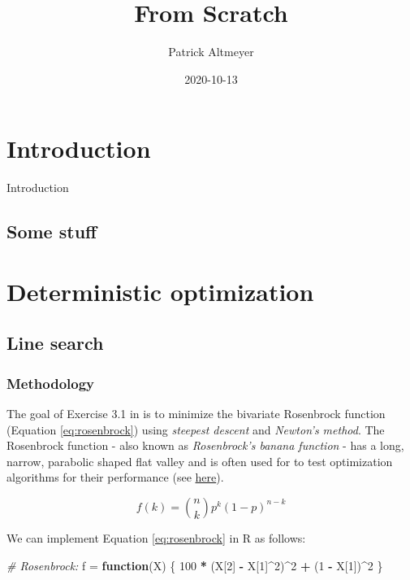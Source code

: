 \documentclass[
]{book}
\title{From Scratch}
\author{Patrick Altmeyer}
\date{2020-10-13}
\newenvironment{Shaded}{\begin{snugshade}}{\end{snugshade}}
\newcommand{\CommentTok}[1]{\textcolor[rgb]{0.56,0.35,0.01}{\textit{#1}}}
\newcommand{\ControlFlowTok}[1]{\textcolor[rgb]{0.13,0.29,0.53}{\textbf{#1}}}
\newcommand{\DecValTok}[1]{\textcolor[rgb]{0.00,0.00,0.81}{#1}}
\newcommand{\NormalTok}[1]{#1}
\newcommand{\OperatorTok}[1]{\textcolor[rgb]{0.81,0.36,0.00}{\textbf{#1}}}
\newcommand{\StringTok}[1]{\textcolor[rgb]{0.31,0.60,0.02}{#1}}
\begin{document}
\maketitle

{
\setcounter{tocdepth}{1}
\tableofcontents
}
\hypertarget{intro}{%
\chapter{Introduction}\label{intro}}

Introduction

\hypertarget{some-stuff}{%
\section{Some stuff}\label{some-stuff}}

\hypertarget{det-opt}{%
\chapter{Deterministic optimization}\label{det-opt}}

\hypertarget{line-search}{%
\section{Line search}\label{line-search}}

\hypertarget{methodology}{%
\subsection{Methodology}\label{methodology}}

The goal of Exercise 3.1 in \citet{nw2006numerical} is to minimize the bivariate Rosenbrock function (Equation \eqref{eq:rosenbrock}) using \emph{steepest descent} and \emph{Newton's method}. The Rosenbrock function - also known as \emph{Rosenbrock's banana function} - has a long, narrow, parabolic shaped flat valley and is often used for to test optimization algorithms for their performance (see \href{https://en.wikipedia.org/wiki/Rosenbrock_function}{here}).

\begin{equation} 
  f\left(k\right) = \binom{n}{k} p^k\left(1-p\right)^{n-k}
  \label{eq:binom}
\end{equation}

We can implement Equation \eqref{eq:rosenbrock} in R as follows:

\begin{Shaded}
\begin{Highlighting}[]
\CommentTok{# Rosenbrock:}
\NormalTok{f =}\StringTok{ }\ControlFlowTok{function}\NormalTok{(X) \{}
  \DecValTok{100} \OperatorTok{*}\StringTok{ }\NormalTok{(X[}\DecValTok{2}\NormalTok{] }\OperatorTok{-}\StringTok{ }\NormalTok{X[}\DecValTok{1}\NormalTok{]}\OperatorTok{^}\DecValTok{2}\NormalTok{)}\OperatorTok{^}\DecValTok{2} \OperatorTok{+}\StringTok{ }\NormalTok{(}\DecValTok{1} \OperatorTok{-}\StringTok{ }\NormalTok{X[}\DecValTok{1}\NormalTok{])}\OperatorTok{^}\DecValTok{2}
\NormalTok{\}}
\end{Highlighting}
\end{Shaded}
\end{document}
